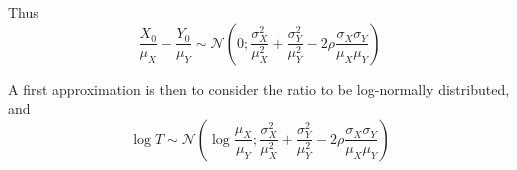\documentclass[../../Main_ManuscritThese.tex]{subfiles}
\begin{document}
  Thus
  \begin{equation}
    \frac{X_0}{\mu_X} - \frac{Y_0}{\mu_Y} \sim \mathcal{N}\left(0;\frac{\sigma^2_X}{\mu_X^2} + \frac{\sigma^2_Y}{\mu_Y^2} - 2 \rho \frac{\sigma_X \sigma_Y}{\mu_X \mu_Y} \right)
  \end{equation}
  
  A first approximation is then to consider the ratio to be log-normally distributed, and
  \begin{equation}
    \log T \sim \mathcal{N}\left(\log \frac{\mu_X}{\mu_Y}; \frac{\sigma^2_X}{\mu_X^2} + \frac{\sigma^2_Y}{\mu_Y^2} - 2 \rho \frac{\sigma_X \sigma_Y}{\mu_X \mu_Y} \right)
  \end{equation}
  


\newpage
\end{document}

